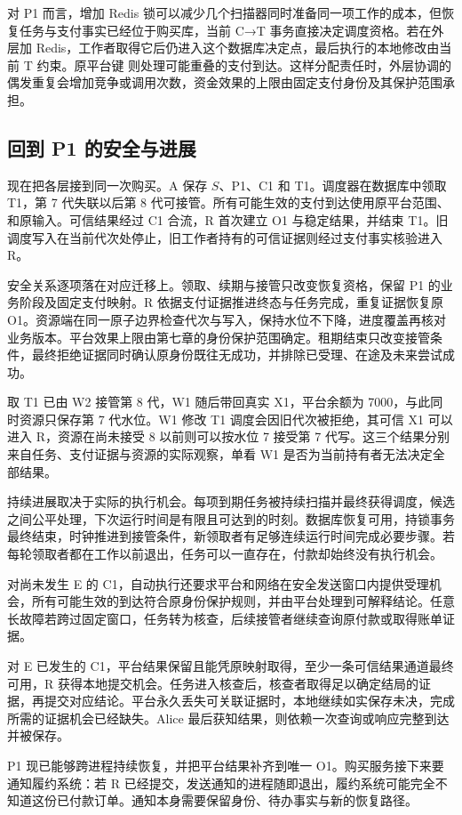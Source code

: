 对 P1 而言，增加 Redis 锁可以减少几个扫描器同时准备同一项工作的成本，但恢复任务与支付事实已经位于购买库，当前 C→T 事务直接决定调度资格。若在外层加 Redis，工作者取得它后仍进入这个数据库决定点，最后执行的本地修改由当前 T 约束。原平台键  则处理可能重叠的支付到达。这样分配责任时，外层协调的偶发重复会增加竞争或调用次数，资金效果的上限由固定支付身份及其保护范围承担。

\subsection*{回到 P1 的安全与进展}

现在把各层接到同一次购买。A 保存 \(S\)、P1、C1 和 T1。调度器在数据库中领取 T1，第 7 代失联以后第 8 代可接管。所有可能生效的支付到达使用原平台范围、 和原输入。可信结果经过 C1 合流，R 首次建立 O1 与稳定结果，并结束 T1。旧调度写入在当前代次处停止，旧工作者持有的可信证据则经过支付事实核验进入 R。

安全关系逐项落在对应迁移上。领取、续期与接管只改变恢复资格，保留 P1 的业务阶段及固定支付映射。R 依据支付证据推进终态与任务完成，重复证据恢复原 O1。资源端在同一原子边界检查代次与写入，保持水位不下降，进度覆盖再核对业务版本。平台效果上限由第七章的身份保护范围确定。租期结束只改变接管条件，最终拒绝证据同时确认原身份既往无成功，并排除已受理、在途及未来尝试成功。

取 T1 已由 W2 接管第 8 代，W1 随后带回真实 X1，平台余额为 7000，与此同时资源只保存第 7 代水位。W1 修改 T1 调度会因旧代次被拒绝，其可信 X1 可以进入 R，资源在尚未接受 8 以前则可以按水位 7 接受第 7 代写。这三个结果分别来自任务、支付证据与资源的实际观察，单看 W1 是否为当前持有者无法决定全部结果。

持续进展取决于实际的执行机会。每项到期任务被持续扫描并最终获得调度，候选之间公平处理，下次运行时间是有限且可达到的时刻。数据库恢复可用，持锁事务最终结束，时钟推进到接管条件，新领取者有足够连续运行时间完成必要步骤。若每轮领取者都在工作以前退出，任务可以一直存在，付款却始终没有执行机会。

对尚未发生 E 的 C1，自动执行还要求平台和网络在安全发送窗口内提供受理机会，所有可能生效的到达符合原身份保护规则，并由平台处理到可解释结论。任意长故障若跨过固定窗口，任务转为核查，后续接管者继续查询原付款或取得账单证据。

对 E 已发生的 C1，平台结果保留且能凭原映射取得，至少一条可信结果通道最终可用，R 获得本地提交机会。任务进入核查后，核查者取得足以确定结局的证据，再提交对应结论。平台永久丢失可关联证据时，本地继续如实保存未决，完成所需的证据机会已经缺失。Alice 最后获知结果，则依赖一次查询或响应完整到达并被保存。

P1 现已能够跨进程持续恢复，并把平台结果补齐到唯一 O1。购买服务接下来要通知履约系统：若 R 已经提交，发送通知的进程随即退出，履约系统可能完全不知道这份已付款订单。通知本身需要保留身份、待办事实与新的恢复路径。
